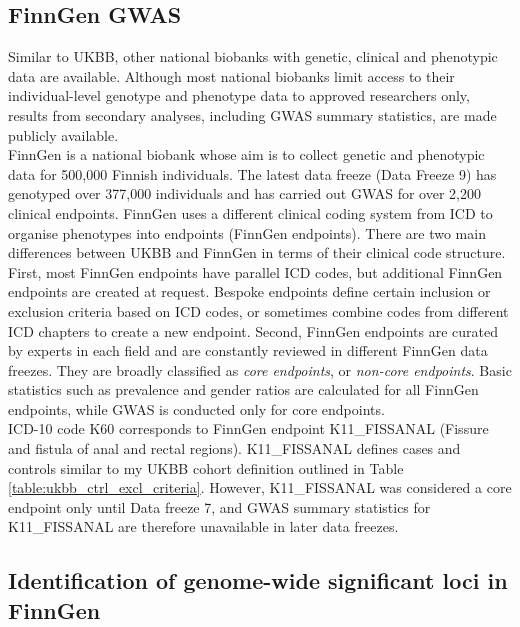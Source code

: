   



      \subsection{FinnGen GWAS}
      Similar to UKBB, other national biobanks with genetic, clinical and phenotypic data are available. Although most national biobanks limit access to their individual-level genotype and phenotype data to approved researchers only, results from secondary analyses, including GWAS summary statistics, are made publicly available. \\

      FinnGen is a national biobank whose aim is to collect genetic and phenotypic data for 500,000 Finnish individuals. The latest data freeze (Data Freeze 9) has genotyped over 377,000 individuals and has carried out GWAS for over 2,200 clinical endpoints. FinnGen uses a different clinical coding system from ICD to organise phenotypes into endpoints (FinnGen endpoints). There are two main differences between UKBB and FinnGen in terms of their clinical code structure. First, most FinnGen endpoints have parallel ICD codes, but additional FinnGen endpoints are created at request. Bespoke endpoints define certain inclusion or exclusion criteria based on ICD codes, or sometimes combine codes from different ICD chapters to create a new endpoint. Second, FinnGen endpoints are curated by experts in each field and are constantly reviewed in different FinnGen data freezes. They are broadly classified as \textit{core endpoints}, or \textit{non-core endpoints}. Basic statistics such as prevalence and gender ratios are calculated for all FinnGen endpoints, while GWAS is conducted only for core endpoints.\\

ICD-10 code K60 corresponds to FinnGen endpoint K11\_FISSANAL (Fissure and fistula of anal and rectal regions). K11\_FISSANAL defines cases and controls similar to my UKBB cohort definition outlined in Table \ref{table:ukbb_ctrl_excl_criteria}. However, K11\_FISSANAL was considered a core endpoint only until Data freeze 7, and GWAS summary statistics for K11\_FISSANAL are therefore unavailable in later data freezes. 

\subsection{Identification of genome-wide significant loci in FinnGen}

